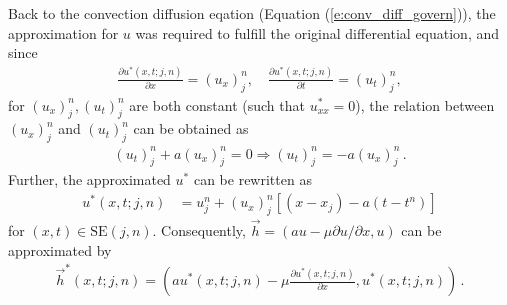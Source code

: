 \documentclass[11pt,dvips]{article}
\numberwithin{equation}{section}
\begin{document}
Back to the convection diffusion eqation (Equation (\ref{e:conv_diff_govern})),
the approximation for $u$ was required to fulfill the original differential
equation, and since
\begin{align*}
  \frac{\partial u^*(x,t;j,n)}{\partial x} = (u_x)_j^n, \quad
  \frac{\partial u^*(x,t;j,n)}{\partial t} = (u_t)_j^n,
\end{align*}
for $(u_x)_j^n, (u_t)_j^n$ are both constant (such that $u^*_{xx}=0$), the
relation between $(u_x)_j^n$ and $(u_t)_j^n$ can be obtained as
\begin{align*}
              (u_t)_j^n + a(u_x)_j^n = 0
  \Rightarrow (u_t)_j^n = -a(u_x)_j^n\,.
\end{align*}
Further, the approximated $u^*$ can be rewritten as
\begin{align*}
  u^*(x,t;j,n) &= u_j^n + (u_x)_j^n[(x-x_j) - a(t-t^n)]
\end{align*}
for $(x,t)\in\mathrm{SE}(j,n)$.  Consequently, $\vec{h}=(au-\mu\partial
u/\partial x, u)$ can be approximated by
\begin{align*}
  \vec{h}^*(x,t;j,n) =
  \left(
    au^*(x,t;j,n)-\mu\frac{\partial u^*(x,t;j,n)}{\partial x}, u^*(x,t;j,n)
  \right)\,.
\end{align*}
\end{document}
